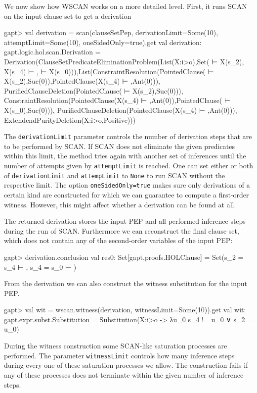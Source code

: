 \documentclass[a4paper,11pt]{book}
\begin{document}
We now show how WSCAN works on a more detailed level.
First, it runs SCAN on the input clause set to get a derivation
\begin{clilisting}
gapt> val derivation = scan(clauseSetPep, derivationLimit=Some(10), attemptLimit=Some(10), oneSidedOnly=true).get
val derivation: gapt.logic.hol.scan.Derivation = Derivation(ClauseSetPredicateEliminationProblem(List(X:i>o),Set( ⊢ X(s_2), X(s_4) ⊢ ,  ⊢ X(s_0))),List(ConstraintResolution(PointedClause( ⊢ X(s_2),Suc(0)),PointedClause(X(s_4) ⊢ ,Ant(0))), PurifiedClauseDeletion(PointedClause( ⊢ X(s_2),Suc(0))), ConstraintResolution(PointedClause(X(s_4) ⊢ ,Ant(0)),PointedClause( ⊢ X(s_0),Suc(0))), PurifiedClauseDeletion(PointedClause(X(s_4) ⊢ ,Ant(0))), ExtendendPurityDeletion(X:i>o,Positive)))

\end{clilisting}
The \texttt{derivationLimit} parameter controls the number of derivation steps that are to be performed by SCAN.
If SCAN does not eliminate the given predicates within this limit, the method tries again with another set of inferences until the number of attempts given by \texttt{attemptLimit} is reached.
One can set either or both of \texttt{derivationLimit} and \texttt{attempLimit} to \texttt{None} to run SCAN without the respective limit.
The option \texttt{oneSidedOnly=true} makes sure only derivations of a certain kind are constructed for which we can guarantee to compute a first-order witness.
However, this might affect whether a derivation can be found at all.

The returned derivation stores the input PEP and all performed inference steps during the run of SCAN.
Furthermore we can reconstruct the final clause set, which does not contain any of the second-order variables of the input PEP:
\begin{clilisting}
gapt> derivation.conclusion
val res0: Set[gapt.proofs.HOLClause] = Set(s_2 = s_4 ⊢ , s_4 = s_0 ⊢ )

\end{clilisting}
From the derivation we can also construct the witness substitution for the input PEP.
\begin{clilisting}
gapt> val wit = wscan.witness(derivation, witnessLimit=Some(10)).get
val wit: gapt.expr.subst.Substitution = Substitution(X:i>o -> λu_0 s_4 != u_0 ∨ s_2 = u_0)

\end{clilisting}
During the witness construction some SCAN-like saturation processes are performed.
The parameter \texttt{witnessLimit} controls how many inference steps during every one of these saturation processes we allow.
The construction fails if any of these processes does not terminate within the given number of inference steps.
\end{document}
